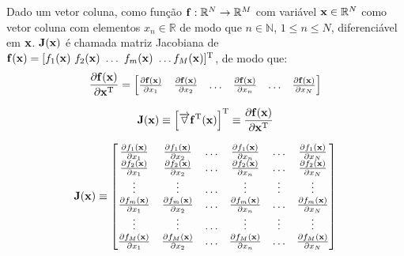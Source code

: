 \begin{proposition}\label{def:jacobian}
 Dado um vetor coluna, como função $\VECTOR{f}:\mathbb{R}^{N}\rightarrow \mathbb{R}^{M}$ com variável $\VECTOR{x} \in \mathbb{R}^{N}$
 como vetor coluna com elementos $x_n\in \mathbb{R}$ de modo que $n\in \mathbb{N}$, $1 \leq n \leq N$,
 diferenciável em $\VECTOR{x}$. 
 $\MATRIX{J}(\VECTOR{x})$ é chamada matriz Jacobiana \cite[pp. 130]{zhang2017matrix} \cite{Jacobian}  de 
 $\VECTOR{f}(\VECTOR{x})=[f_1(\VECTOR{x})~f_2(\VECTOR{x})~\dots~f_m(\VECTOR{x})~\dots f_M(\VECTOR{x})]^{\transpose}$, de modo que: 
 \begin{equation}
   \frac{\partial \VECTOR{f}(\VECTOR{x})}{\partial \VECTOR{x}^{\transpose} }=
\left[
\begin{matrix}
\frac{\partial \VECTOR{f}(\VECTOR{x}) }{\partial x_{1}}&
\frac{\partial \VECTOR{f}(\VECTOR{x}) }{\partial x_{2}}&
\hdots&
\frac{\partial \VECTOR{f}(\VECTOR{x}) }{\partial x_{n}}&
\hdots&
\frac{\partial \VECTOR{f}(\VECTOR{x}) }{\partial x_{N}}
\end{matrix}
\right]
 \end{equation}

\begin{equation}
\MATRIX{J}(\VECTOR{x})\equiv
\left[\overrightarrow{\triangledown} \VECTOR{f}^{\transpose}(\VECTOR{x})\right]^{\transpose} \equiv 
\frac{\partial \VECTOR{f}(\VECTOR{x})}{\partial \VECTOR{x}^{\transpose} }
\end{equation}

  \begin{equation}
  \MATRIX{J}(\VECTOR{x})\equiv 
\left[
\begin{matrix}
\frac{\partial f_1(\VECTOR{x}) }{\partial x_{1}}&
\frac{\partial f_1(\VECTOR{x}) }{\partial x_{2}}&
\hdots&
\frac{\partial f_1(\VECTOR{x}) }{\partial x_{n}}&
\hdots&
\frac{\partial f_1(\VECTOR{x}) }{\partial x_{N}}\\
\frac{\partial f_2(\VECTOR{x}) }{\partial x_{1}}&
\frac{\partial f_2(\VECTOR{x}) }{\partial x_{2}}&
\hdots&
\frac{\partial f_2(\VECTOR{x}) }{\partial x_{n}}&
\hdots&
\frac{\partial f_2(\VECTOR{x}) }{\partial x_{N}}\\
\vdots&
\vdots&
\hdots&
\vdots&
\vdots&
\vdots\\
\frac{\partial f_m(\VECTOR{x}) }{\partial x_{1}}&
\frac{\partial f_m(\VECTOR{x}) }{\partial x_{2}}&
\hdots&
\frac{\partial f_m(\VECTOR{x}) }{\partial x_{n}}&
\hdots&
\frac{\partial f_m(\VECTOR{x}) }{\partial x_{N}}\\
\vdots&
\vdots&
\hdots&
\vdots&
\vdots&
\vdots\\
\frac{\partial f_M(\VECTOR{x}) }{\partial x_{1}}&
\frac{\partial f_M(\VECTOR{x}) }{\partial x_{2}}&
\hdots&
\frac{\partial f_M(\VECTOR{x}) }{\partial x_{n}}&
\hdots&
\frac{\partial f_M(\VECTOR{x}) }{\partial x_{N}}\\
\end{matrix}
\right]
 \end{equation}
\end{proposition}


